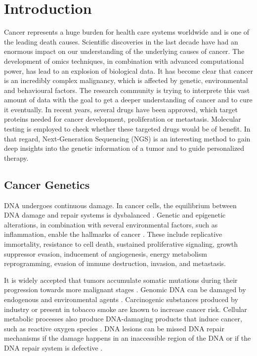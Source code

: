 \section{Introduction}

  Cancer represents a huge burden for health care systems worldwide and is one
  of the leading death causes. Scientific discoveries in the last decade have
  had an enormous impact on our understanding of the underlying causes of
  cancer. The development of omics techniques, in combination with advanced
  computational power, has lead to an explosion of biological data. It has
  become clear that cancer is an incredibly complex malignancy, which is
  affected by genetic, environmental and behavioural factors. The research
  community is trying to interprete this vast amount of data with the goal to
  get a deeper understanding of cancer and to cure it eventually. In recent
  years, several drugs have been approved, which target proteins needed for
  cancer development, proliferation or metastasis. Molecular testing is employed
  to check whether these targeted drugs would be of benefit. In that regard,
  Next-Generation Sequencing (NGS) is an interesting method to gain deep
  insights into the genetic information of a tumor and to guide personalized
  therapy.

  \subsection{Cancer Genetics}

    DNA undergoes continuous damage. In cancer cells, the equilibrium
    between DNA damage and repair systems is dysbalanced
    {\cite{dna_repair_epidemioloy}}. Genetic and epigenetic alterations, in
    combination with several environmental factors, such as inflammation, enable
    the hallmarks of cancer {\cite{cancer_hallmarks}}. These include replicative
    immortality, resistance to cell death, sustained proliferative signaling, growth suppressor evasion, inducement of
    angiogenesis, energy metabolism reprogramming, evasion of immune
    destruction, invasion, and metastasis.

    It is widely accepted that tumors accumulate somatic mutations during their
    progression towards more malignant stages {\cite{accumulation_rates}}
    {\cite{mutations_counting}}. Genomic DNA can be damaged by endogenous and
    environmental agents {\cite{multiple_mutations}}. Carcinogenic substances
    produced by industry {\cite{occupational_exposure}} {\cite{rubber_industry}}
    or present in tobacco smoke {\cite{smoking_cancer}} are known to increase
    cancer risk. Cellular metabolic processes also produce DNA-damaging products
    that induce cancer, such as reactive oxygen species {\cite{ros_cancer}}
    {\cite{ros_cancer_other}}. DNA lesions can be missed DNA repair mechanisms if
    the damage happens in an inaccessible region of the DNA or if the DNA repair
    system is defective {\cite{dna_repair}}.

